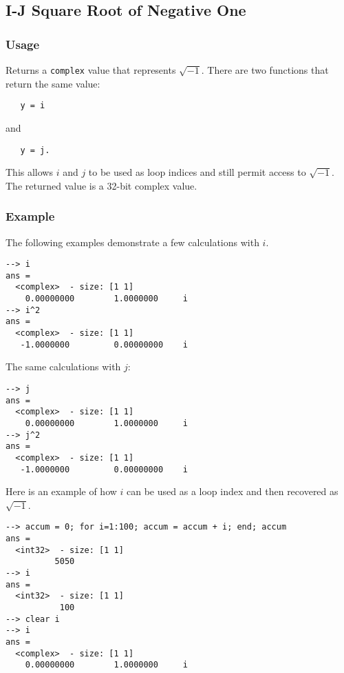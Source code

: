 %
%
%
\subsection{I-J Square Root of Negative One}
\subsubsection{Usage}
Returns a \verb|complex| value that represents $\sqrt{-1}$.  There are two
functions that return the same value:
\begin{verbatim}
   y = i
\end{verbatim}
and 
\begin{verbatim}
   y = j.
\end{verbatim}
This allows $i$ and $j$ to be used as loop indices and still permit access to $\sqrt{-1}$.  The returned value is a 32-bit complex value.
\subsubsection{Example}
The following examples demonstrate a few calculations with $i$.
\begin{verbatim}
--> i
ans =
  <complex>  - size: [1 1]
    0.00000000        1.0000000     i
--> i^2
ans =
  <complex>  - size: [1 1]
   -1.0000000         0.00000000    i
\end{verbatim}
The same calculations with $j$:
\begin{verbatim}
--> j
ans =
  <complex>  - size: [1 1]
    0.00000000        1.0000000     i
--> j^2
ans =
  <complex>  - size: [1 1]
   -1.0000000         0.00000000    i
\end{verbatim}
Here is an example of how $i$ can be used as a loop index and then recovered as $\sqrt{-1}$.
\begin{verbatim}
--> accum = 0; for i=1:100; accum = accum + i; end; accum
ans =
  <int32>  - size: [1 1]
          5050
--> i
ans =
  <int32>  - size: [1 1]
           100
--> clear i
--> i
ans =
  <complex>  - size: [1 1]
    0.00000000        1.0000000     i
\end{verbatim}
